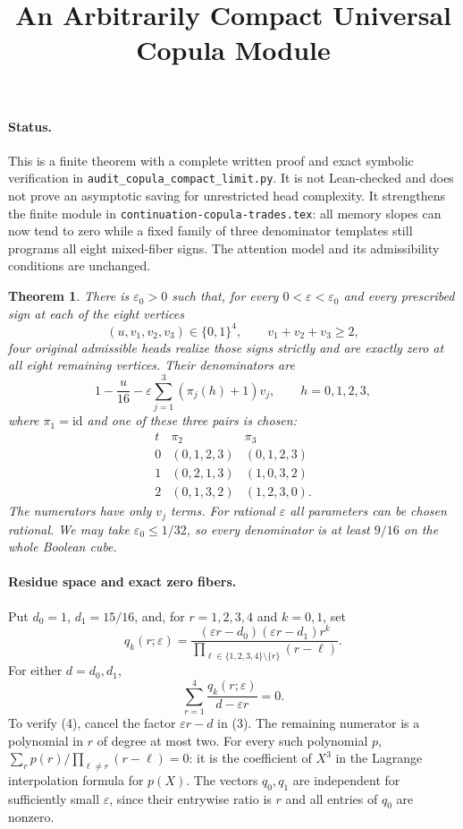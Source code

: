 \documentclass[11pt]{article}
\title{An Arbitrarily Compact Universal Copula Module}
\author{}
\date{}
\newtheorem{theorem}{Theorem}
\begin{document}
\maketitle

\paragraph{Status.}
This is a finite theorem with a complete written proof and exact symbolic
verification in \texttt{audit\_copula\_compact\_limit.py}. It is not
Lean-checked and does not prove an asymptotic saving for unrestricted
head complexity. It strengthens the finite module in
\texttt{continuation-copula-trades.tex}: all memory slopes can now tend
to zero while a fixed family of three denominator templates still
programs all eight mixed-fiber signs. The attention model and its
admissibility conditions are unchanged.

\begin{theorem}\label{thm:compact}
There is $\varepsilon_0>0$ such that, for every
$0<\varepsilon<\varepsilon_0$ and every prescribed sign at each of
the eight vertices
\[
 (u,v_1,v_2,v_3)\in\{0,1\}^4,
 \qquad v_1+v_2+v_3\ge2,
\]
four original admissible heads realize those signs strictly and are
exactly zero at all eight remaining vertices. Their denominators are
\[
 1-\frac{u}{16}-\varepsilon
       \sum_{j=1}^3(\pi_j(h)+1)v_j,\qquad h=0,1,2,3,
 \tag{1}
\]
where $\pi_1=\mathrm{id}$ and one of these three pairs is chosen:
\[
\begin{array}{c|c|c}
 t&\pi_2&\pi_3\\\hline
 0&(0,1,2,3)&(0,1,2,3)\\
 1&(0,2,1,3)&(1,0,3,2)\\
 2&(0,1,3,2)&(1,2,3,0).
\end{array}
\tag{2}
\]
The numerators have only $v_j$ terms. For rational $\varepsilon$ all
parameters can be chosen rational. We may take $\varepsilon_0\le1/32$,
so every denominator is at least $9/16$ on the whole Boolean cube.
\end{theorem}

\paragraph{Residue space and exact zero fibers.}
Put $d_0=1$, $d_1=15/16$, and, for $r=1,2,3,4$ and $k=0,1$, set
\[
 q_k(r;\varepsilon)=
 \frac{(\varepsilon r-d_0)(\varepsilon r-d_1)r^k}
      {\prod_{\ell\in\{1,2,3,4\}\setminus\{r\}}(r-\ell)}.
 \tag{3}
\]
For either $d=d_0,d_1$,
\[
 \sum_{r=1}^4\frac{q_k(r;\varepsilon)}{d-\varepsilon r}=0.
 \tag{4}
\]
To verify (4), cancel the factor $\varepsilon r-d$ in (3).
The remaining numerator is a polynomial in $r$ of degree at most two.
For every such polynomial $p$,
$\sum_r p(r)/\prod_{\ell\ne r}(r-\ell)=0$: it is the coefficient
of $X^3$ in the Lagrange interpolation formula for $p(X)$.
The vectors $q_0,q_1$ are independent for sufficiently small
$\varepsilon$, since their entrywise ratio is $r$ and all entries of
$q_0$ are nonzero.
\end{document}
